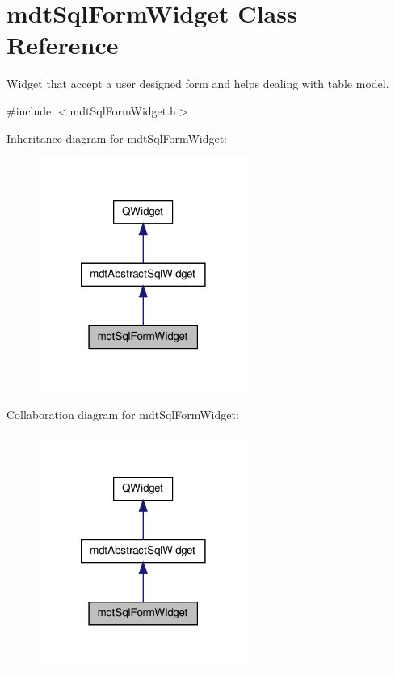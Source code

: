 \hypertarget{classmdt_sql_form_widget}{\section{mdt\-Sql\-Form\-Widget Class Reference}
\label{classmdt_sql_form_widget}
}


Widget that accept a user designed form and helps dealing with table model.  




{\ttfamily \#include $<$mdt\-Sql\-Form\-Widget.\-h$>$}



Inheritance diagram for mdt\-Sql\-Form\-Widget\-:
\nopagebreak
\begin{figure}[H]
\begin{center}
\leavevmode
\includegraphics[width=194pt]{classmdt_sql_form_widget__inherit__graph}
\end{center}
\end{figure}


Collaboration diagram for mdt\-Sql\-Form\-Widget\-:
\nopagebreak
\begin{figure}[H]
\begin{center}
\leavevmode
\includegraphics[width=194pt]{classmdt_sql_form_widget__coll__graph}
\end{center}
\end{figure}
